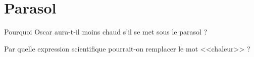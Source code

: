 \section{Parasol}\label{ex:parasol}

\begin{questions}
	\question Pourquoi Oscar aura-t-il moins chaud s'il se met sous le parasol ?
	
	\question Par quelle expression scientifique pourrait-on remplacer le mot <<chaleur>> ?
\end{questions}